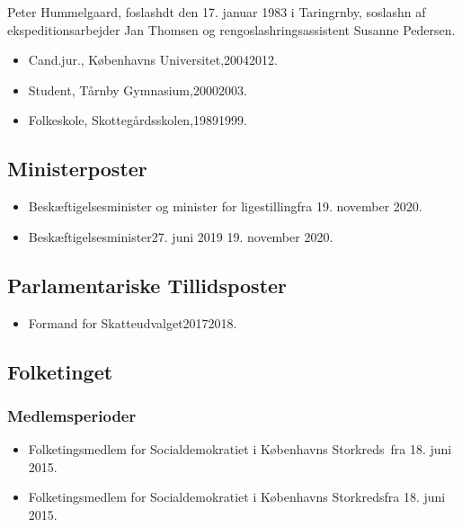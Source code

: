 \documentclass[11pt, a4paper]{awesome-cv}
\begin{document}
\makecvheader[R]
\makelettertitle
\begin{cvletter}
Peter Hummelgaard, foslashdt den 17. januar 1983 i Taringrnby, soslashn af ekspeditionsarbejder Jan Thomsen og rengoslashringsassistent Susanne Pedersen.

\begin{itemize}
\item Cand.jur., Københavns Universitet,20042012.
\item Student, Tårnby Gymnasium,20002003.
\item Folkeskole, Skottegårdsskolen,19891999.
\end{itemize}
\subsection*{Ministerposter}
\begin{itemize}
\item Beskæftigelsesminister og minister for ligestillingfra 19. november 2020.
\item Beskæftigelsesminister27. juni 2019  19. november 2020.
\end{itemize}
\subsection*{Parlamentariske Tillidsposter}
\begin{itemize}
\item Formand for Skatteudvalget20172018.
\end{itemize}
\subsection*{Folketinget}
\subsubsection*{Medlemsperioder}
\begin{itemize}
\item Folketingsmedlem for Socialdemokratiet i Københavns Storkreds fra 18. juni 2015.
\item Folketingsmedlem for Socialdemokratiet i Københavns Storkredsfra 18. juni 2015.
\end{itemize}

\end{cvletter}
\end{document}
